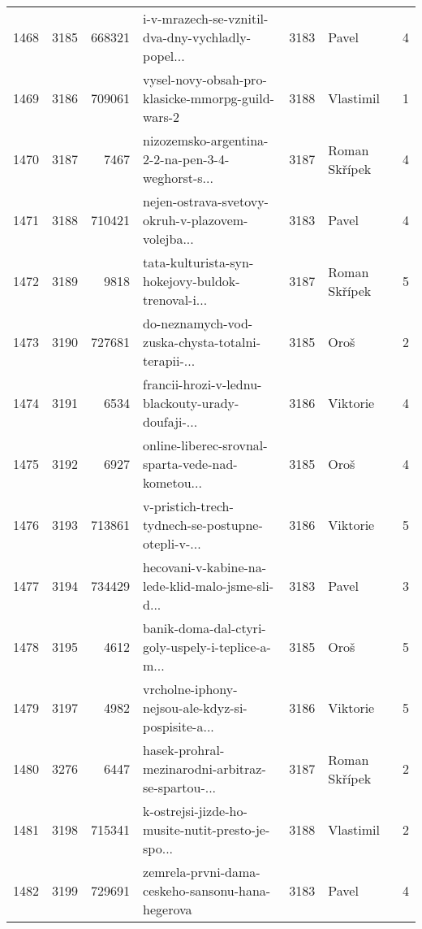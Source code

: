 \begin{tabular}{lrrlrlr}
1468 &       3185 &   668321 &  i-v-mrazech-se-vznitil-dva-dny-vychladly-popel... &     3183 &                        Pavel &               4 \\
1469 &       3186 &   709061 &  vysel-novy-obsah-pro-klasicke-mmorpg-guild-wars-2 &     3188 &                    Vlastimil &               1 \\
1470 &       3187 &     7467 &  nizozemsko-argentina-2-2-na-pen-3-4-weghorst-s... &     3187 &                Roman Skřípek &               4 \\
1471 &       3188 &   710421 &  nejen-ostrava-svetovy-okruh-v-plazovem-volejba... &     3183 &                        Pavel &               4 \\
1472 &       3189 &     9818 &  tata-kulturista-syn-hokejovy-buldok-trenoval-i... &     3187 &                Roman Skřípek &               5 \\
1473 &       3190 &   727681 &  do-neznamych-vod-zuska-chysta-totalni-terapii-... &     3185 &                         Oroš &               2 \\
1474 &       3191 &     6534 &  francii-hrozi-v-lednu-blackouty-urady-doufaji-... &     3186 &                     Viktorie &               4 \\
1475 &       3192 &     6927 &  online-liberec-srovnal-sparta-vede-nad-kometou... &     3185 &                         Oroš &               4 \\
1476 &       3193 &   713861 &  v-pristich-trech-tydnech-se-postupne-otepli-v-... &     3186 &                     Viktorie &               5 \\
1477 &       3194 &   734429 &  hecovani-v-kabine-na-lede-klid-malo-jsme-sli-d... &     3183 &                        Pavel &               3 \\
1478 &       3195 &     4612 &  banik-doma-dal-ctyri-goly-uspely-i-teplice-a-m... &     3185 &                         Oroš &               5 \\
1479 &       3197 &     4982 &  vrcholne-iphony-nejsou-ale-kdyz-si-pospisite-a... &     3186 &                     Viktorie &               5 \\
1480 &       3276 &     6447 &  hasek-prohral-mezinarodni-arbitraz-se-spartou-... &     3187 &                Roman Skřípek &               2 \\
1481 &       3198 &   715341 &  k-ostrejsi-jizde-ho-musite-nutit-presto-je-spo... &     3188 &                    Vlastimil &               2 \\
1482 &       3199 &   729691 &   zemrela-prvni-dama-ceskeho-sansonu-hana-hegerova &     3183 &                        Pavel &               4 \\

\end{tabular}
